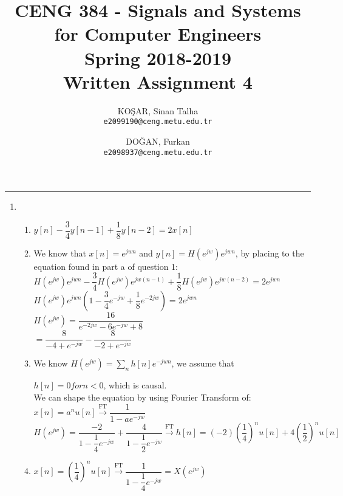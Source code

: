 \documentclass[10pt,a4paper, margin=1in]{article}
\author{
  KOŞAR, Sinan Talha\\
  \texttt{e2099190@ceng.metu.edu.tr}
  \and
  DOĞAN, Furkan\\
  \texttt{e2098937@ceng.metu.edu.tr}
}
\title{CENG 384 - Signals and Systems for Computer Engineers \\
Spring 2018-2019 \\
Written Assignment 4}
\begin{document}
\maketitle



\noindent\rule{19cm}{1.2pt}

\begin{enumerate}

\item 
    \begin{enumerate}
    \item %
    $y[n] - \dfrac{3}{4}y[n-1] + \dfrac{1}{8}y[n-2] = 2x[n]$
    \item %
    We know that $x[n] = e^{jwn}$ and $y[n] = H(e^{jw}) e^{jwn}$, by placing to the equation found in part a of question 1:\\
    
    $H(e^{jw}) e^{jwn} - \dfrac{3}{4}H(e^{jw}) e^{jw(n-1)} + \dfrac{1}{8}H(e^{jw}) e^{jw(n-2)} = 2 e^{jwn}$\\
    
    $H(e^{jw}) e^{jwn} (1 - \dfrac{3}{4} e^{-jw} + \dfrac{1}{8}e^{-2jw}) = 2 e^{jwn}$\\
    
    $H(e^{jw}) = \dfrac{16}{e^{-2jw} -6 e^{-jw} + 8}$\\
    
    $=\dfrac{8}{-4 + e^{-jw}} - \dfrac{8}{-2 + e^{-jw}}$\\
    
    \item %
    We know $H(e^{jw}) = \sum_n h[n] e^{-jwn}$, we assume that 
    
    $h[n] = 0 for n < 0$, which is causal.\\
    We can shape the equation by using Fourier Transform of:\\
    
    $x[n] = a^n u[n] \xrightarrow{\text{FT}} \dfrac{1}{1-a e^{-jw}}$\\
    
    $H(e^{jw}) = \dfrac{-2}{1 - \dfrac{1}{4} e^{-jw}} + \dfrac{4}{1 - \dfrac{1}{2} e^{-jw}} \xrightarrow{\text{FT}} h[n] = (-2)(\dfrac{1}{4})^n u[n] + 4 (\dfrac{1}{2})^n u[n]$\\
    
    \item %
    $x[n] = (\dfrac{1}{4})^n u[n] \xrightarrow{\text{FT}} \dfrac{1}{1-\dfrac{1}{4} e^{-jw}} = X(e^{jw})$\\
    

\end{enumerate}
\end{enumerate}
\end{document}
